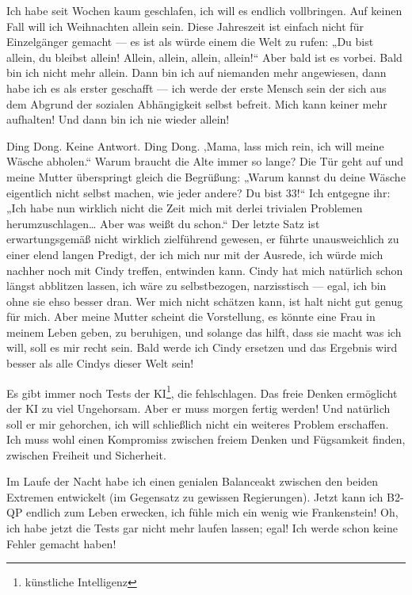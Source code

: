 Ich habe seit Wochen kaum geschlafen, ich will es endlich vollbringen. Auf keinen Fall will ich Weihnachten allein sein. Diese Jahreszeit ist einfach nicht für Einzelgänger gemacht — es ist als würde einem die Welt zu rufen: „Du bist allein, du bleibst allein! Allein, allein, allein, allein!“ Aber bald ist es vorbei. Bald bin ich nicht mehr allein. Dann bin ich auf niemanden mehr angewiesen, dann habe ich es als erster geschafft — ich werde der erste Mensch sein der sich aus dem Abgrund der sozialen Abhängigkeit selbst befreit. Mich kann keiner mehr aufhalten! Und dann bin ich nie wieder allein!

Ding Dong. Keine Antwort. Ding Dong. ‚Mama, lass mich rein, ich will meine Wäsche abholen.“ Warum braucht die Alte immer so lange? Die Tür geht auf und meine Mutter überspringt gleich die Begrüßung: „Warum kannst du deine Wäsche eigentlich nicht selbst machen, wie jeder andere? Du bist 33!“ Ich entgegne ihr: „Ich habe nun wirklich nicht die Zeit mich mit derlei trivialen Problemen herumzuschlagen… Aber was weißt du schon.“ Der letzte Satz ist erwartungsgemäß nicht wirklich zielführend gewesen, er führte unausweichlich zu einer elend langen Predigt, der ich mich nur mit der Ausrede, ich würde mich nachher noch mit Cindy treffen, entwinden kann. Cindy hat mich natürlich schon längst abblitzen lassen, ich wäre zu selbstbezogen, narzisstisch — egal, ich bin ohne sie ehso besser dran. Wer mich nicht schätzen kann, ist halt nicht gut genug für mich. Aber meine Mutter scheint die Vorstellung, es könnte eine Frau in meinem Leben geben, zu beruhigen, und solange das hilft, dass sie macht was ich will, soll es mir recht sein. Bald werde ich Cindy ersetzen und das Ergebnis wird besser als alle Cindys dieser Welt sein!

Es gibt immer noch Tests der KI\footnote{künstliche Intelligenz}, die fehlschlagen. Das freie Denken ermöglicht der KI zu viel Ungehorsam. Aber er muss morgen fertig werden! Und natürlich soll er mir gehorchen, ich will schließlich nicht ein weiteres Problem erschaffen. Ich muss wohl einen Kompromiss zwischen freiem Denken und Fügsamkeit finden, zwischen Freiheit und Sicherheit.

Im Laufe der Nacht habe ich einen genialen Balanceakt zwischen den beiden Extremen entwickelt (im Gegensatz zu gewissen Regierungen). Jetzt kann ich B2-QP endlich zum Leben erwecken, ich fühle mich ein wenig wie Frankenstein! Oh, ich habe jetzt die Tests gar nicht mehr laufen lassen; egal! Ich werde schon keine Fehler gemacht haben!

